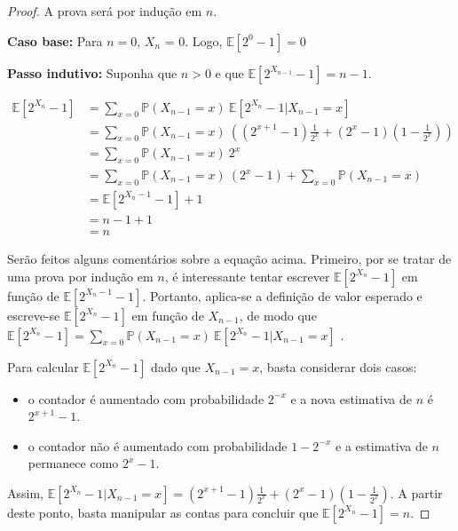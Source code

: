 \begin{proof}
A prova será por indução em $n$. 

\textbf{Caso base:} Para $n = 0$, $X_n$ = 0. Logo, $\mathbb{E}[2^0 - 1] = 0$

\textbf{Passo indutivo:} Suponha que $n > 0$ e que $\mathbb{E}[2^{X_{n-1}} - 1] = n-1$.

\begin{align*}
  \mathbb{E}[2^{X_n} - 1] &= \sum_{x = 0} \mathbb{P} (X_{n-1} = x) \ \mathbb{E}[2^{X_n} - 1 | X_{n-1} = x] \\
                          &= \sum_{x = 0} \mathbb{P} (X_{n-1} = x) \ ((2^{x+1} - 1) \frac{1}{2^x} +  (2^x - 1) (1 - \frac{1}{2^x})) \\
                          &= \sum_{x = 0} \mathbb{P} (X_{n-1} = x) \ 2^x \\
                          &= \sum_{x = 0} \mathbb{P} (X_{n-1} = x) \ (2^x - 1) + \sum_{x = 0} \mathbb{P} (X_{n-1} = x) \\
                          &= \mathbb{E}[2^{X_n-1} - 1] + 1 \\
                          &= n - 1 + 1 \\
                          &= n
\end{align*}

Serão feitos alguns comentários sobre a equação acima. Primeiro, por se tratar de uma prova por indução em $n$, é interessante tentar escrever 
$\mathbb{E}[2^{X_n} - 1]$ em função de $\mathbb{E}[2^{X_n-1} - 1]$. Portanto, aplica-se a definição de valor esperado e escreve-se $\mathbb{E}[2^{X_n} - 1]$
em função de $X_{n-1}$, de modo que $\mathbb{E}[2^{X_n} - 1] = \sum_{x = 0} \mathbb{P} (X_{n-1} = x) \ \mathbb{E}[2^{X_n} - 1 | X_{n-1} = x]$ . 

Para calcular $\mathbb{E}[2^{X_n} - 1]$ dado que $X_{n-1} = x$, basta considerar dois casos: 
\begin{itemize}
  \item o contador é aumentado com probabilidade $2^{-x}$ e a nova estimativa de $n$ é $2^{x+1} - 1$.
  \item o contador não é aumentado com probabilidade $1 - 2^{-x}$ e a estimativa de $n$ permanece como $2^{x} - 1$.
\end{itemize}

Assim, $\mathbb{E}[2^{X_n} - 1 | X_{n-1} = x] = (2^{x+1} - 1) \frac{1}{2^x} +  (2^x - 1) (1 - \frac{1}{2^x})$. 
A partir deste ponto, basta manipular as contas para concluir que $\mathbb{E}[2^{X_n} - 1] = n$.

\end{proof}

